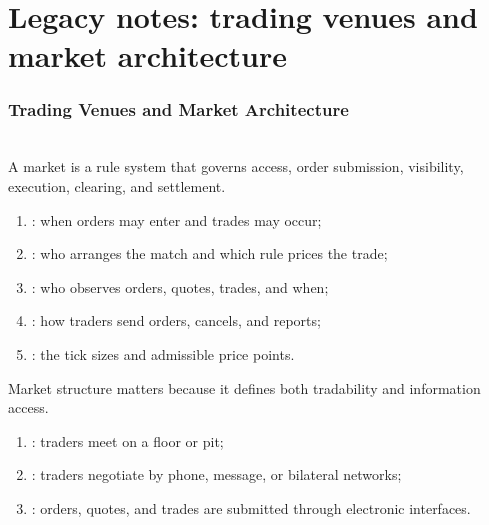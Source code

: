 \documentclass[a4paper,oneside,openany]{book}
\begin{document}
\chapter*{Legacy notes: trading venues and market architecture}

\subsection*{Trading Venues and Market Architecture}

\begin{principle} \\
A market is a rule system that governs access, order submission, visibility, execution, clearing, and settlement.
\end{principle}

\begin{taxonomy} 
\begin{enumerate}[label=\roman*.]
\setlength{\itemsep}{0pt}
\item {}: when orders may enter and trades may occur;
\item {}: who arranges the match and which rule prices the trade;
\item {}: who observes orders, quotes, trades, and when;
\item {}: how traders send orders, cancels, and reports;
\item {}: the tick sizes and admissible price points.
\end{enumerate}
Market structure matters because it defines both tradability and information access.
\end{taxonomy}

\begin{taxonomy} 
\begin{enumerate}[label=\roman*.]
\setlength{\itemsep}{0pt}
\item {}: traders meet on a floor or pit;
\item {}: traders negotiate by phone, message, or bilateral networks;
\item {}: orders, quotes, and trades are submitted through electronic interfaces.
\end{enumerate}
\end{taxonomy}
\end{document}
